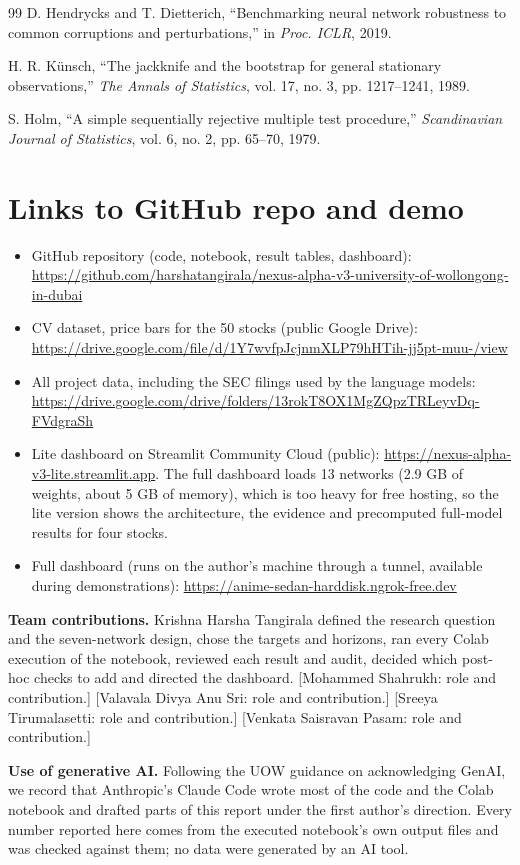 \documentclass[11pt,a4paper]{article}
\begin{document}
\begin{thebibliography}{99}
 D. Hendrycks and T. Dietterich, ``Benchmarking neural network robustness to common corruptions and perturbations,'' in \emph{Proc. ICLR}, 2019.

 H. R. Künsch, ``The jackknife and the bootstrap for general stationary observations,'' \emph{The Annals of Statistics}, vol. 17, no. 3, pp. 1217--1241, 1989.

 S. Holm, ``A simple sequentially rejective multiple test procedure,'' \emph{Scandinavian Journal of Statistics}, vol. 6, no. 2, pp. 65--70, 1979.

\end{thebibliography}

\section{Links to GitHub repo and demo}

\begin{itemize}
\item GitHub repository (code, notebook, result tables, dashboard): \url{https://github.com/harshatangirala/nexus-alpha-v3-university-of-wollongong-in-dubai}
\item CV dataset, price bars for the 50 stocks (public Google Drive): \url{https://drive.google.com/file/d/1Y7wvfpJcjnmXLP79hHTih-jj5pt-muu-/view}
\item All project data, including the SEC filings used by the language models: \url{https://drive.google.com/drive/folders/13rokT8OX1MgZQpzTRLeyvDq-FVdgraSh}
\item Lite dashboard on Streamlit Community Cloud (public): \url{https://nexus-alpha-v3-lite.streamlit.app}. The full dashboard loads 13 networks (2.9 GB of weights, about 5 GB of memory), which is too heavy for free hosting, so the lite version shows the architecture, the evidence and precomputed full-model results for four stocks.
\item Full dashboard (runs on the author's machine through a tunnel, available during demonstrations): \url{https://anime-sedan-harddisk.ngrok-free.dev}
\end{itemize}

\textbf{Team contributions.} Krishna Harsha Tangirala defined the research question and the seven-network design, chose the targets and horizons, ran every Colab execution of the notebook, reviewed each result and audit, decided which post-hoc checks to add and directed the dashboard. [Mohammed Shahrukh: role and contribution.] [Valavala Divya Anu Sri: role and contribution.] [Sreeya Tirumalasetti: role and contribution.] [Venkata Saisravan Pasam: role and contribution.]

\textbf{Use of generative AI.} Following the UOW guidance on acknowledging GenAI, we record that Anthropic's Claude Code wrote most of the code and the Colab notebook and drafted parts of this report under the first author's direction. Every number reported here comes from the executed notebook's own output files and was checked against them; no data were generated by an AI tool.
\end{document}
